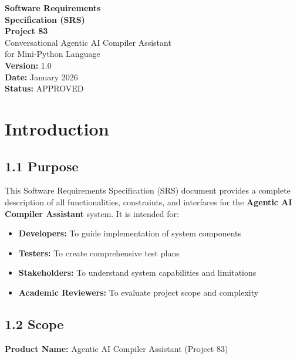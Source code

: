 \documentclass[a4paper,11pt]{article}
\begin{document}
\begin{center}
    {\Huge \textbf{Software Requirements}} \\
    {\Huge \textbf{Specification (SRS)}} \\
    \vspace{5mm}
    {\LARGE \textbf{Project 83}} \\
    {\large Conversational Agentic AI Compiler Assistant} \\
    {\large for Mini-Python Language} \\
    \vspace{5mm}
    \textbf{Version:} 1.0 \\
    \textbf{Date:} January 2026 \\
    \textbf{Status:} APPROVED
\end{center}

\vspace{5mm}

\tableofcontents
\clearpage

\section{Introduction}

\subsection{1.1 Purpose}

This Software Requirements Specification (SRS) document provides a complete description of all functionalities, constraints, and interfaces for the \textbf{Agentic AI Compiler Assistant} system. It is intended for:

\begin{itemize}
    \item \textbf{Developers:} To guide implementation of system components
    \item \textbf{Testers:} To create comprehensive test plans
    \item \textbf{Stakeholders:} To understand system capabilities and limitations
    \item \textbf{Academic Reviewers:} To evaluate project scope and complexity
\end{itemize}

\subsection{1.2 Scope}

\textbf{Product Name:} Agentic AI Compiler Assistant (Project 83)
\end{document}

